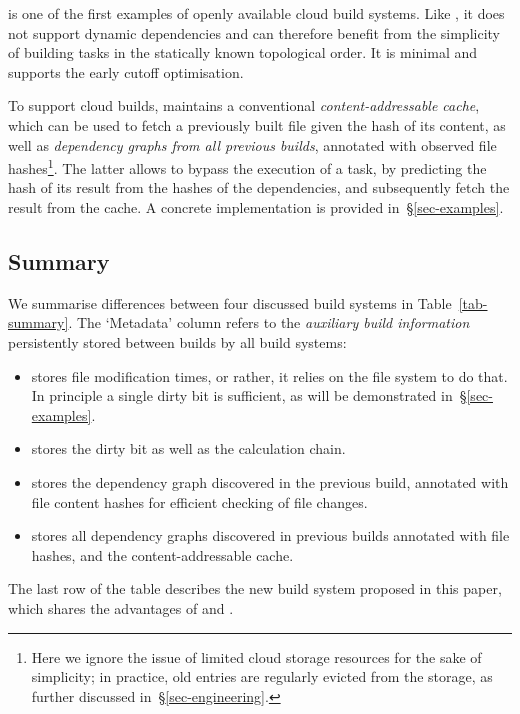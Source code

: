 \Bazel is one of the first examples of openly available cloud build systems.
Like \Make, it does not support dynamic dependencies and can therefore benefit
from the simplicity of building tasks in the statically known topological order.
It is minimal and supports the early cutoff optimisation.

To support cloud builds, \Bazel maintains a conventional \emph{content-addressable
cache}, which can be used to fetch a previously built file given the hash of its
content, as well as \emph{dependency graphs from all previous builds}, annotated
with observed file hashes\footnote{Here we ignore the issue of limited cloud
storage resources for the sake of simplicity; in practice, old entries are
regularly evicted from the storage, as further discussed in~\S\ref{sec-engineering}.}.
The latter allows to bypass the execution of a task, by predicting the hash of
its result from the hashes of the dependencies, and subsequently fetch the result
from the cache. A concrete implementation is provided in~\S\ref{sec-examples}.

\subsection{Summary}
\label{sec-background-summary}

We summarise differences between four discussed build systems in
Table~\ref{tab-summary}. The `Metadata' column refers to the \emph{auxiliary
build information} persistently stored between builds by all build systems:
\begin{itemize}
    \item \Make stores file modification times, or rather, it relies on the file
    system to do that. In principle a single dirty bit is sufficient, as will be
    demonstrated in~\S\ref{sec-examples}.
    \item \Excel stores the dirty bit as well as the calculation chain.
    \item \Shake stores the dependency graph discovered in the previous build,
    annotated with file content hashes for efficient checking of file changes.
    \item \Bazel stores all dependency graphs discovered in previous builds
    annotated with file hashes, and the content-addressable cache.
\end{itemize}

The last row of the table describes the new build system proposed in this paper,
which shares the advantages of \Shake and \Bazel.


